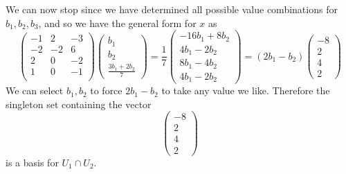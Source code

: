 \documentclass{article}
\newcommand{\chapternumber}{2}
\newenvironment{QandA}{\begin{enumerate}[label=\chapternumber.\arabic*]\bfseries\boldmath}
	{\end{enumerate}}
\newenvironment{answered}{\par\bigskip\normalfont\unboldmath}{}
\begin{document}
\begin{QandA}
\begin{answered}
			We can now stop since we have determined all possible value combinations for $b_1,b_2,b_3$, and so we have the general form for $x$ as
			\[
			\begin{pmatrix}
				-1 &  2 & -3 \\
				-2 & -2 &  6 \\
				2 &  0 & -2 \\
				1 &  0 & -1 \\
			\end{pmatrix}
			\begin{pmatrix}
				b_1 \\ b_2 \\ \frac{3b_1+2b_2}{7}
			\end{pmatrix}
			=
			\frac{1}{7}
			\begin{pmatrix}
				-16b_1+8b_2 \\ 4b_1-2b_2 \\ 8b_1-4b_2 \\ 4b_1-2b_2
			\end{pmatrix}
			=(2b_1-b_2)
			\begin{pmatrix}
				-8 \\ 2 \\ 4 \\ 2
			\end{pmatrix}
			\]
			We can select $b_1,b_2$ to force $2b_1-b_2$ to take any value we like. Therefore the singleton set containing the vector
			\[\begin{pmatrix}
				-8 \\ 2 \\ 4 \\ 2
			\end{pmatrix}
			\]
			is a basis for $U_1\cap U_2$.
		\end{answered}
	\end{QandA}
\end{document}
